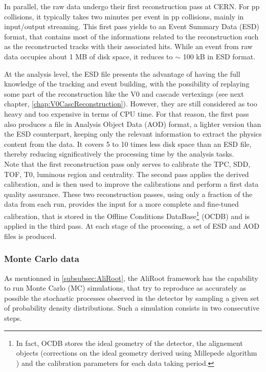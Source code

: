 In parallel, the raw data undergo their first reconstruction pass at CERN. For pp collisions, it typically takes two minutes per event in pp collisions, mainly in input/output streaming. This first pass yields to an Event Summary Data (ESD) format, that  contains most of the informations related to the reconstruction such as the reconstructed tracks with their associated hits. While an event from raw data occupies about 1 MB of disk space, it reduces to $\sim$ 100 kB in ESD format. 

At the analysis level, the ESD file presents the advantage of having the full knowledge of the tracking and event building, with the possibility of replaying some part of the reconstruction like the V0 and cascade vertexings (see next chapter, \chap\ref{chap:V0CascReconstruction}). However, they are still considered as too heavy and too expensive in terms of CPU time. For that reason, the first pass also produces a file in Analysis Object Data (AOD) format, a lighter version than the ESD counterpart, keeping only the relevant information to extract the physics content from the data. It covers 5 to 10 times less disk space than an ESD file, thereby reducing significatively the processing time by the analysis tasks.\\

Note that the first reconstruction pass only serves to calibrate the TPC, SDD, TOF, T0, luminous region and centrality. The second pass applies the derived calibration, and is then used to improve the calibrations and perform a first data quality assurance. These two reconstruction passes, using only a fraction of the data from each run, provides the input for a more complete and fine-tuned calibration, that is stored in the Offline Conditions DataBase\footnote{In fact, OCDB stores the ideal geometry of the detector,  the alignement objects (\ie corrections on the ideal geometry derived using Millepede algorithm \cite{blobelNewMethodHighPrecision2002}) and the calibration parameters for each data taking period.} (OCDB) and is applied in the third pass. At each stage of the processing, a set of ESD and AOD files is produced. 

\subsubsection{Monte Carlo data}
\label{subsubsec:MCData}

As mentionned in \Sec\ref{subsubsec:AliRoot}, the AliRoot framework has the capability to run Monte Carlo (MC) simulations, that try to reproduce as accurately as possible the stochastic processes observed in the detector by sampling a given set of probability density distributions. Such a simulation consists in two consecutive steps.

